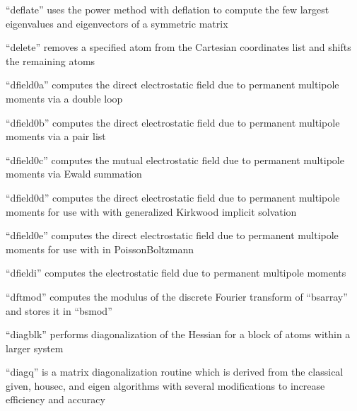 \documentclass[letterpaper,11pt,english]{sphinxmanual}
\begin{document}
“deflate” uses the power method with deflation to compute the
few largest eigenvalues and eigenvectors of a symmetric matrix


“delete” removes a specified atom from the Cartesian
coordinates list and shifts the remaining atoms





“dfield0a” computes the direct electrostatic field due to
permanent multipole moments via a double loop


“dfield0b” computes the direct electrostatic field due to
permanent multipole moments via a pair list


“dfield0c” computes the mutual electrostatic field due to
permanent multipole moments via Ewald summation


“dfield0d” computes the direct electrostatic field due to
permanent multipole moments for use with with generalized
Kirkwood implicit solvation


“dfield0e” computes the direct electrostatic field due to
permanent multipole moments for use with in Poisson\sphinxhyphen{}Boltzmann


“dfieldi” computes the electrostatic field due to permanent
multipole moments


“dftmod” computes the modulus of the discrete Fourier transform
of “bsarray” and stores it in “bsmod”


“diagblk” performs diagonalization of the Hessian for a
block of atoms within a larger system


“diagq” is a matrix diagonalization routine which is derived
from the classical given, housec, and eigen algorithms with
several modifications to increase efficiency and accuracy
\end{document}
